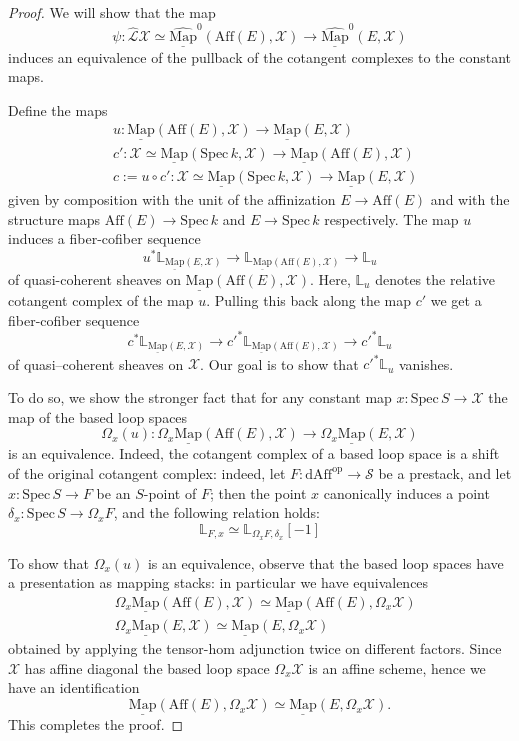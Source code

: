 \documentclass[11pt,letterpaper]{amsart}
\newcommand{\bL}{\mathbb{L}}
\newcommand{\cS}{\mathcal{S}}
\newcommand{\cL}{\mathcal{L}}
\newcommand{\cX}{\mathcal{X}}
\newcommand{\Map}[2]{\underline{\mathrm{Map}}\left (#1,#2\right )}
\newcommand{\fMapo}[2]{\underline{\widehat{\mathrm{Map}}}^{0}\left (#1,#2\right )}
\newcommand{\op}{\mathrm{op}}
\newcommand{\dAff}{\mathrm{dAff}}
\newcommand{\Aff}[1]{\mathrm{Aff}(#1)}
\newcommand{\Spec}{\mathrm{S}\mathrm{pec}\,}
\begin{document}
\begin{proof}
We will show that the map 
$$\psi:\widehat{\cL}\cX\simeq\fMapo{\Aff{E}}{\cX}\rightarrow\fMapo{E}{\cX}$$
induces an equivalence of the pullback of the cotangent complexes to the constant maps.

Define the maps
\begin{align*}
& u:\Map{\Aff{E}}{\cX}\rightarrow\Map{E}{\cX} \\
& c':\cX\simeq\Map{\Spec k}{\cX}\rightarrow\Map{\Aff{E}}{\cX}\\
& c:=u\circ c':\cX\simeq\Map{\Spec k}{\cX}\rightarrow\Map{E}{\cX}
\end{align*}
given by composition with the unit of the affinization $E\rightarrow\Aff{E}$ and with the structure maps $\Aff{E}\rightarrow\Spec k$ and $E\rightarrow\Spec k$ respectively. The map $u$ induces a fiber-cofiber sequence
\begin{equation*}
u^\ast\bL_{\Map{E}{\cX}}\rightarrow\bL_{\Map{\Aff{E}}{\cX}}\rightarrow\bL_{u}
\end{equation*}
of quasi-coherent sheaves on $\Map{\Aff{E}}{\cX}$. Here, $\bL_u$ denotes the relative cotangent complex of the map $u$.
Pulling this back along the map $c'$ we get a fiber-cofiber sequence
\begin{equation*}
c^\ast\bL_{\Map{E}{\cX}}\rightarrow c'^\ast\bL_{\Map{\Aff{E}}{\cX}}\rightarrow c'^\ast\bL_{u}
\end{equation*}
of quasi--coherent sheaves on $\cX$. Our goal is to show that $c'^\ast\bL_u$ vanishes. 

To do so, we show the stronger fact that for any constant map $x:\Spec S\to \cX$ the map of the based loop spaces
$$\Omega_x(u):\Omega_x\Map{\Aff{E}}{\cX}\to\Omega_x\Map{E}{\cX}$$
is an equivalence.
Indeed, the cotangent complex of a based loop space is a shift of the original cotangent complex: indeed, let $F:\dAff^\op\to\cS$ be a prestack, and let $x:\Spec S\to F$ be an $S$-point of $F$; then the point $x$ canonically induces a point $\delta_x:\Spec S\to \Omega_x F$, and the following relation holds:
$$\bL_{F,x} \simeq \bL_{\Omega_x F,\delta_x}[-1]$$

To show that $\Omega_x(u)$ is an equivalence, observe that the based loop spaces have a presentation as mapping stacks: in particular we have equivalences
\begin{align*}
& \Omega_x\Map{\Aff{E}}{\cX}\simeq\Map{\Aff{E}}{\Omega_x\cX} \\
& \Omega_x\Map{E}{\cX}\simeq\Map{E}{\Omega_x\cX}
\end{align*}
obtained by applying the tensor-hom adjunction twice on different factors. Since $\cX$ has affine diagonal the based loop space $\Omega_x\cX$ is an affine scheme, hence we have an identification $$\Map{\Aff{E}}{\Omega_x\cX}\simeq\Map{E}{\Omega_x\cX}.$$
This completes the proof.
\end{proof}
\end{document}
